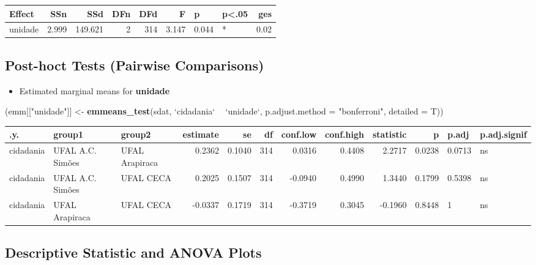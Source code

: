 \documentclass[]{article}
\newenvironment{Shaded}{\begin{snugshade}}{\end{snugshade}}
\newcommand{\DataTypeTok}[1]{\textcolor[rgb]{0.13,0.29,0.53}{#1}}
\newcommand{\KeywordTok}[1]{\textcolor[rgb]{0.13,0.29,0.53}{\textbf{#1}}}
\newcommand{\NormalTok}[1]{#1}
\newcommand{\OperatorTok}[1]{\textcolor[rgb]{0.81,0.36,0.00}{\textbf{#1}}}
\newcommand{\StringTok}[1]{\textcolor[rgb]{0.31,0.60,0.02}{#1}}
\providecommand{\tightlist}{%
  \setlength{\itemsep}{0pt}\setlength{\parskip}{0pt}}
\begin{document}
\begin{longtable}[]{@{}lrrrrrllr@{}}
\toprule
Effect & SSn & SSd & DFn & DFd & F & p & p\textless{}.05 &
ges\tabularnewline
\midrule
\endhead
unidade & 2.999 & 149.621 & 2 & 314 & 3.147 & 0.044 & * &
0.02\tabularnewline
\bottomrule
\end{longtable}

\hypertarget{post-hoct-tests-pairwise-comparisons}{%
\subsection{Post-hoct Tests (Pairwise
Comparisons)}\label{post-hoct-tests-pairwise-comparisons}}

\begin{itemize}
\tightlist
\item
  Estimated marginal means for \textbf{unidade}
\end{itemize}

\begin{Shaded}
\begin{Highlighting}[]
\NormalTok{(emm[[}\StringTok{"unidade"}\NormalTok{]] <-}\StringTok{ }\KeywordTok{emmeans_test}\NormalTok{(sdat, }\StringTok{`}\DataTypeTok{cidadania}\StringTok{`} \OperatorTok{~}\StringTok{ `}\DataTypeTok{unidade}\StringTok{`}\NormalTok{, }\DataTypeTok{p.adjust.method =} \StringTok{"bonferroni"}\NormalTok{, }\DataTypeTok{detailed =}\NormalTok{ T))}
\end{Highlighting}
\end{Shaded}

\begin{longtable}[]{@{}lllrrrrrrrll@{}}
\toprule
.y. & group1 & group2 & estimate & se & df & conf.low & conf.high &
statistic & p & p.adj & p.adj.signif\tabularnewline
\midrule
\endhead
cidadania & UFAL A.C. Simões & UFAL Arapiraca & 0.2362 & 0.1040 & 314 &
0.0316 & 0.4408 & 2.2717 & 0.0238 & 0.0713 & ns\tabularnewline
cidadania & UFAL A.C. Simões & UFAL CECA & 0.2025 & 0.1507 & 314 &
-0.0940 & 0.4990 & 1.3440 & 0.1799 & 0.5398 & ns\tabularnewline
cidadania & UFAL Arapiraca & UFAL CECA & -0.0337 & 0.1719 & 314 &
-0.3719 & 0.3045 & -0.1960 & 0.8448 & 1 & ns\tabularnewline
\bottomrule
\end{longtable}

\hypertarget{descriptive-statistic-and-anova-plots}{%
\subsection{Descriptive Statistic and ANOVA
Plots}\label{descriptive-statistic-and-anova-plots}}
\end{document}
